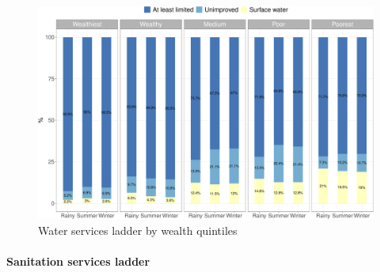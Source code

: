 \documentclass[12pt,a4paper]{article}
\let\oldparagraph\paragraph
\renewcommand{\paragraph}[1]{\oldparagraph{#1}\mbox{}}
\begin{document}
\begin{figure}[H]

{\centering \includegraphics{kayahReport_files/figure-latex/wash2plot-1} 

}

\caption{Water services ladder by wealth quintiles}\label{fig:wash2plot}
\end{figure}

\hypertarget{sanitation-services-ladder}{%
\paragraph{Sanitation services ladder}\label{sanitation-services-ladder}}
\end{document}
